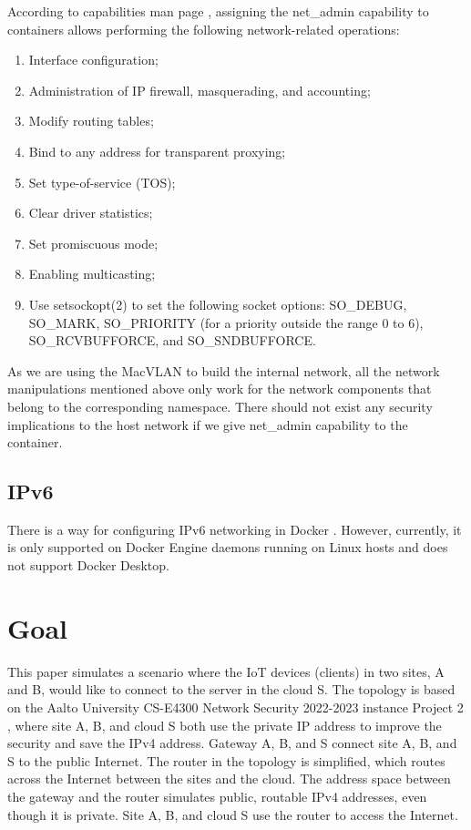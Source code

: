 \documentclass[article]{aaltoseries}
\begin{document}
According to capabilities man page \cite{capabilities}, assigning the net\_admin capability to containers allows performing the following network-related operations:
\begin{enumerate}
\setlength{\itemsep}{0pt}
\setlength{\parsep}{0pt}
\setlength{\parskip}{0pt}
\item Interface configuration;
\item Administration of IP firewall, masquerading, and accounting;
\item Modify routing tables;
\item Bind to any address for transparent proxying;
\item Set type-of-service (TOS);
\item Clear driver statistics;
\item Set promiscuous mode;
\item Enabling multicasting;
\item Use setsockopt(2) to set the following socket options:
SO\_DEBUG, SO\_MARK, SO\_PRIORITY (for a priority outside the
range 0 to 6), SO\_RCVBUFFORCE, and SO\_SNDBUFFORCE.
\end{enumerate}

As we are using the MacVLAN to build the internal network, all the network manipulations mentioned above only work for the network components that belong to the corresponding namespace. There should not exist any security implications to the host network if we give net\_admin capability to the container.

\subsection{IPv6}
There is a way for configuring IPv6 networking in Docker \cite{docker_documentation_ipv6_2023}. However, currently, it is only supported on Docker Engine daemons running on Linux hosts and does not support Docker Desktop.



\section{Goal}

This paper simulates a scenario where the IoT devices (clients) in two sites, A and B, would like to connect to the server in the cloud S. The topology is based on the Aalto University CS-E4300 Network Security 2022-2023 instance Project 2 \cite{aura_peltonen_bui_2022}, where site A, B, and cloud S both use the private IP address to improve the security and save the IPv4 address. Gateway A, B, and S connect site A, B, and S to the public Internet. The router in the topology is simplified, which routes across the Internet between the sites and the cloud. The address space between the gateway and the router simulates public, routable IPv4 addresses, even though it is private. Site A, B, and cloud S use the router to access the Internet.
\end{document}
